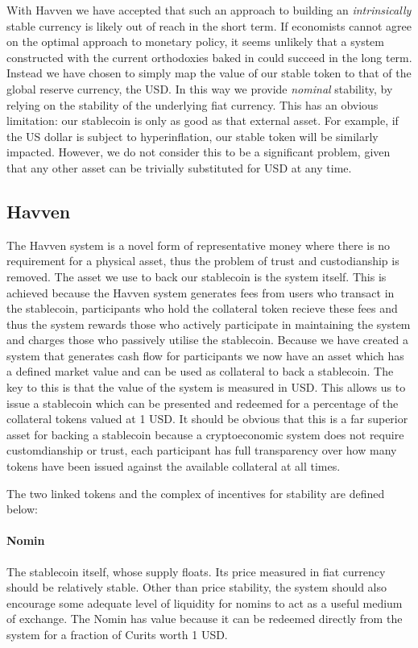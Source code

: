 \noindent With Havven we have accepted that such an approach to building an \textit{intrinsically} stable
currency is likely out of reach in the short term.
If economists cannot agree on the optimal approach to monetary policy, it seems unlikely that a system
constructed with the current orthodoxies baked in could succeed in the long term.
Instead we have chosen to simply map the value of our stable token to that of the global reserve currency, the USD.
In this way we provide \textit{nominal} stability, by relying on the stability of the underlying
fiat currency. This has an obvious limitation: our stablecoin is only as good as that external asset.
For example, if the US dollar is subject to hyperinflation, our stable token will be similarly impacted.
However, we do not consider this to be a significant problem, given that any other asset can be trivially substituted for USD at any time. \\

\subsection{Havven}
\noindent The Havven system is a novel form of representative money where there is no requirement for a physical asset, thus the problem of trust and custodianship is removed. The asset we use to back our stablecoin is the system itself. This is achieved because the Havven system generates fees from users who transact in the stablecoin, participants who hold the collateral token recieve these fees and thus the system rewards those who actively participate in maintaining the system and charges those who passively utilise the stablecoin. Because we have created a system that generates cash flow for participants we now have an asset which has a defined market value and can be used as collateral to back a stablecoin. The key to this is that the value of the system is measured in USD. This allows us to issue a stablecoin which can be presented and redeemed for a percentage of the collateral tokens valued at 1 USD. It should be obvious that this is a far superior asset for backing a stablecoin because a cryptoeconomic system does not require customdianship or trust, each participant has full transparency over how many tokens have been issued against the available collateral at all times.

The two linked tokens and the complex of incentives for stability are defined below:

\paragraph{Nomin} The stablecoin itself, whose supply floats. Its price measured in fiat currency should be relatively stable.
Other than price stability, the system should also encourage some adequate level of liquidity for nomins
to act as a useful medium of exchange. The Nomin has value because it can be redeemed directly from the system for a fraction of Curits worth 1 USD.

